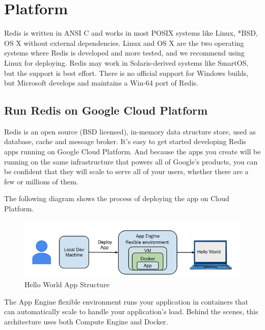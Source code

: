 \chapter{Platform}
Redis is written in ANSI C and works in most POSIX systems like Linux, *BSD, OS X without external dependencies. Linux and OS X are the two operating systems where Redis is developed and more tested, and we recommend using Linux for deploying. Redis may work in Solaris-derived systems like SmartOS, but the support is best effort. There is no official support for Windows builds, but Microsoft develops and maintains a Win-64 port of Redis.

\section{Run Redis on Google Cloud Platform}
Redis is an open source (BSD licensed), in-memory data structure store, used as database, cache and message broker.
It's easy to get started developing Redis apps running on Google Cloud Platform. And because the apps you create will be running on the same infrastructure that powers all of Google's products, you can be confident that they will scale to serve all of your users, whether there are a few or millions of them.

The following diagram shows the process of deploying the app on Cloud Platform.

\begin{figure}[htb!]
\centerline{\includegraphics{resources/hello-world-app-structure.png}}
\caption{Hello World App Structure}
\label{hello-world-app-structure}
\end{figure}
The App Engine flexible environment runs your application in containers that can automatically scale to handle your application's load. Behind the scenes, this architecture uses both Compute Engine and Docker.
